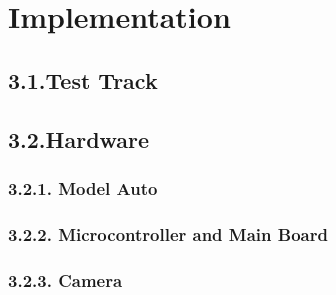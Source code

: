 %
\chapter{Implementation}\label{cha:Implementation}
%
\section*{3.1.Test Track}\label{sec:Test Track}
%
\section*{3.2.Hardware}\label{sec:Hardware}

%
\subsection*{3.2.1. Model Auto}\label{sec:Model Auto}
%

\subsection*{3.2.2. Microcontroller and Main Board}\label{sec:Microcontroller and Main Board}
%

\subsection*{3.2.3. Camera}\label{sec:Camera}

